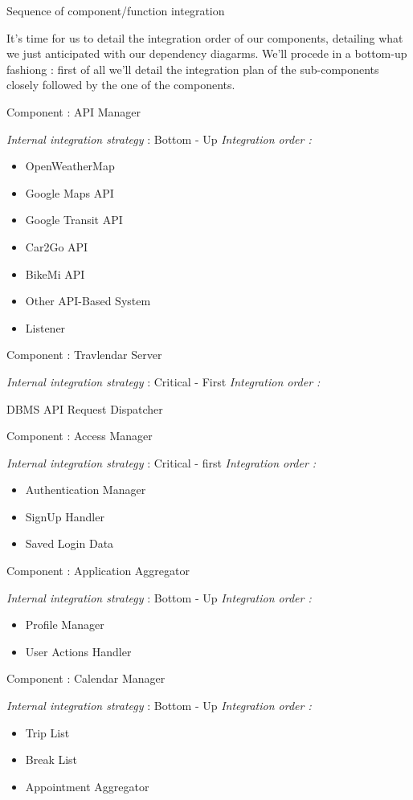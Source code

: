 Sequence of component/function integration

It's time for us to detail the integration order of our components, detailing what we just anticipated with our dependency diagarms.
We'll procede in a bottom-up fashiong : first of all we'll detail the integration plan of the sub-components closely followed by the one of the components.


Component : API Manager

\textit{Internal integration strategy} : Bottom - Up
\textit{Integration order :}
	\begin{itemize}
		\item OpenWeatherMap
		\item Google Maps API
		\item Google Transit API
		\item Car2Go API
		\item BikeMi API
		\item Other API-Based System
		\item Listener
	\end{itemize}


Component : Travlendar Server

\textit{Internal integration strategy} : Critical - First
\textit{Integration order :}
	\begin{itemize}
		\itemize DBMS
		\itemize	 API Request Dispatcher
	\end{itemize}
	

Component : Access Manager

\textit{Internal integration strategy} : Critical - first
\textit{Integration order :}
	\begin{itemize}
		\item Authentication Manager
		\item SignUp Handler
		\item Saved Login Data
	\end{itemize}
		
Component : Application Aggregator

\textit{Internal integration strategy} : Bottom - Up
\textit{Integration order :}
	\begin{itemize}
		\item Profile Manager
		\item User Actions Handler
	\end{itemize}
	
Component : Calendar Manager

\textit{Internal integration strategy} : Bottom - Up
\textit{Integration order :}
	\begin{itemize}
		\item Trip List
		\item Break List
		\item Appointment Aggregator
	\end{itemize}
	
